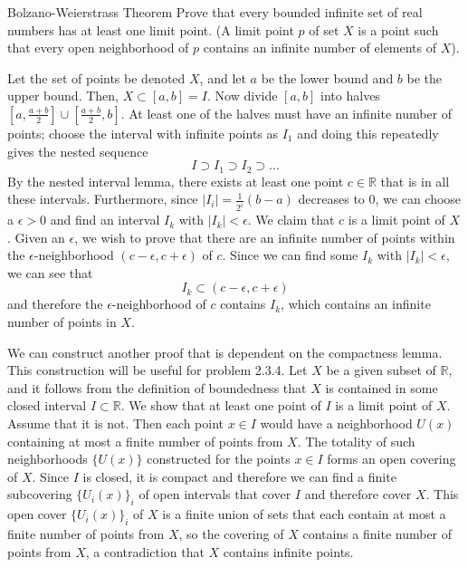 \documentclass{article}
\begin{document}
    \begin{exercise}{Bolzano-Weierstrass Theorem}
    Prove that every bounded infinite set of real numbers has at least one limit point. (A limit point $p$ of set $X$ is a point such that every open neighborhood of $p$ contains an infinite number of elements of $X$). 
    \end{exercise}

    \begin{solution}
    Let the set of points be denoted $X$, and let $a$ be the lower bound and $b$ be the upper bound. Then, $X \subset [a, b] = I$. Now divide $[a, b]$ into halves $[a, \frac{a + b}{2}] \cup [\frac{a + b}{2}, b]$. At least one of the halves must have an infinite number of points; choose the interval with infinite points as $I_1$ and doing this repeatedly gives the nested sequence 
    \[I \supset I_1 \supset I_2 \supset \ldots\]
    By the nested interval lemma, there exists at least one point $c \in \mathbb{R}$ that is in all these intervals. Furthermore, since $|I_i| = \frac{1}{2^i} (b - a)$ decreases to $0$, we can choose a $\epsilon > 0$ and find an interval $I_k$ with $|I_k| < \epsilon$. We claim that $c$ is a limit point of $X$. Given an $\epsilon$, we wish to prove that there are an infinite number of points within the $\epsilon$-neighborhood $(c - \epsilon, c + \epsilon)$ of $c$. Since we can find some $I_k$ with $|I_k| < \epsilon$, we can see that 
    \[I_k \subset (c - \epsilon, c + \epsilon)\]
    and therefore the $\epsilon$-neighborhood of $c$ contains $I_k$, which contains an infinite number of points in $X$. 
    \end{solution}

    \begin{solution}
    We can construct another proof that is dependent on the compactness lemma. This construction will be useful for problem 2.3.4. Let $X$ be a given subset of $\mathbb{R}$, and it follows from the definition of boundedness that $X$ is contained in some closed interval $I \subset \mathbb{R}$. We show that at least one point of $I$ is a limit point of $X$. 
    \\
    Assume that it is not. Then each point $x \in I$ would have a neighborhood $U(x)$ containing at most a finite number of points from $X$. The totality of such neighborhoods $\{U(x)\}$ constructed for the points $x \in I$ forms an open covering of $X$. Since $I$ is closed, it is compact and therefore we can find a finite subcovering $\{U_i(x)\}_{i}$ of open intervals that cover $I$ and therefore cover $X$. This open cover $\{U_i(x)\}_{i}$ of $X$ is a finite union of sets that each contain at most a finite number of points from $X$, so the covering of $X$ contains a finite number of points from $X$, a contradiction that $X$ contains infinite points. 
    \end{solution}
\end{document}
